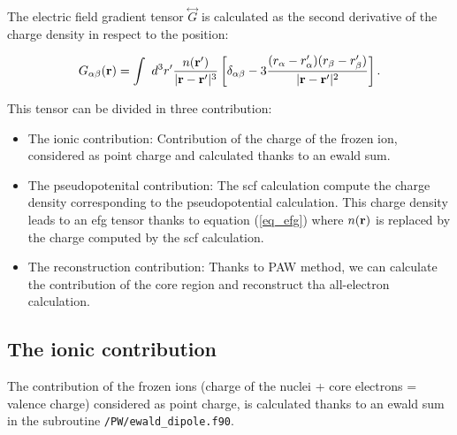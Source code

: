 \documentclass[11pt, a4paper]{article}
\begin{document}
The electric field gradient tensor $\overset{\leftrightarrow}{G}$ is
calculated as the second derivative of the charge density in respect
to the position:

\begin{equation}
 G_{\alpha\beta}({\bf r})=\int\ d^3r^{\prime} \frac{n({\bf
    r^{\prime}})}{|{\bf r}-{\bf
    r}^{\prime}|^3}\left[\delta_{\alpha\beta}
    -3\frac{(r_{\alpha}-r_{\alpha}^{\prime})
    (r_{\beta}-r_{\beta}^{\prime})}{|{\bf r}-{\bf
    r}^{\prime}|^2}\right].
\label{eq_efg} 
\end{equation}

This tensor can be divided in three contribution:
\begin{itemize}
\item The ionic contribution: Contribution of the charge of the frozen
ion, considered as point charge and calculated thanks to an ewald sum.
\item The pseudopotenital contribution: The scf calculation compute
the charge density corresponding to the pseudopotential
calculation. This charge density leads to an efg tensor thanks to
equation (\ref{eq_efg}) where $n({\bf r})$ is replaced by the charge
computed by the scf calculation.
\item The reconstruction contribution: Thanks to PAW method, we can
calculate the contribution of the core region and reconstruct tha
all-electron calculation.
\end{itemize}

\subsection{The ionic contribution}

The contribution of the frozen ions (charge of the nuclei + core
electrons = valence charge) considered as point charge, is calculated
thanks to an ewald sum in the subroutine \verb+/PW/ewald_dipole.f90+.
\end{document}
